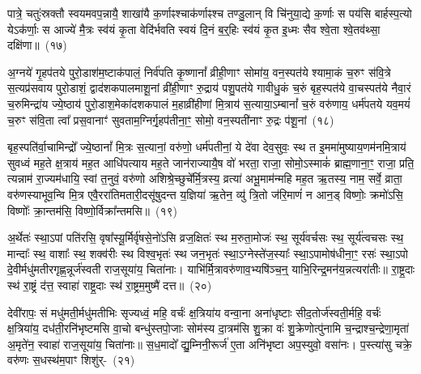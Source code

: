 पात्रे॒ चतुः॑स्रक्तौ स्वयमवप॒न्नायै॒ शाखा॑यै क॒र्णाꣴश्चा\-क॑र्णाꣴश्च तण्डु॒लान् वि चि॑नुया॒द्ये क॒र्णाः स पय॑सि बार्\mbox{}हस्प॒त्यो ये\-ऽक॑र्णाः॒ स आज्ये॑ मै॒त्रः स्व॑यं कृ॒ता वेदि॑र्भवति स्वयं दि॒नं ब॒र्॒\mbox{}हिः स्व॑यं कृ॒त इ॒ध्मः सैव श्वे॒ता श्वे॒तव॑थ्सा॒ दक्षि॑णा॥~(१७)


{\anuvakamend[{सा॒वि॒त्रं द्वाद॑श\-कपाल॒माश्व॑त्थे॒ त्रय॑स्त्रिꣳशच्च}]}%

अ॒ग्नये॑ गृ॒हप॑तये पुरो॒डाश॑\-म॒ष्टा\-क॑पालं॒ निर्व॑पति कृ॒ष्णानां᳚ व्रीही॒णाꣳ सोमा॑य॒ वन॒स्पत॑ये श्यामा॒कं च॒रुꣳ स॑वि॒त्रे स॒त्यप्र॑सवाय पुरो॒डाशं॒ द्वाद॑श\-कपालमाशू॒नां व्री॑ही॒णाꣳ रु॒द्राय॑ पशु॒पत॑ये गावीधु॒कं च॒रुं बृह॒स्पत॑ये वा॒चस्पत॑ये नैवा॒रं च॒रुमिन्द्रा॑य ज्ये॒ष्ठाय॑ पुरो॒डाश॒मेका॑\-दश\-कपालं म॒हाव्री॑हीणां मि॒त्राय॑ स॒त्याया॒\-ऽम्बानां᳚ च॒रुं वरु॑णाय॒ धर्म॑पतये यव॒मयं॑ च॒रुꣳ स॑वि॒ता त्वा᳚ प्रस॒वानाꣳ॑ सुवताम॒ग्निर्गृ॒हप॑तीना॒ꣳ॒ सोमो॒ वन॒स्पती॑नाꣳ रु॒द्रः प॑शू॒नां~(१८)

बृह॒स्पति॑र्वा॒चामिन्द्रो᳚ ज्ये॒ष्ठानां᳚ मि॒त्रः स॒त्यानां॒ वरु॑णो॒ धर्म॑पतीनां॒ ये दे॑वा देव॒सुवः॒ स्थ त इ॒ममा॑मुष्याय॒णम॑\-नमि॒त्राय॑ सुवध्वं मह॒ते क्ष॒त्राय॑ मह॒त आधि॑पत्याय मह॒ते जान॑राज्यायै॒ष वो॑ भरता॒ राजा॒ सोमो॒\-ऽस्माकं॑ ब्राह्म॒णाना॒ꣳ॒ राजा॒ प्रति॒ त्यन्नाम॑ रा॒ज्यम॑धायि॒ स्वां त॒नुवं॒ वरु॑णो अशिश्रे॒च्छुचे᳚र्मि॒त्रस्य॒ व्रत्या॑ अभू॒माम॑न्महि मह॒त ऋ॒तस्य॒ नाम॒ सर्वे॒ व्राता॒ वरु॑णस्याभूव॒न्वि मि॒त्र एवै॒ररा॑तिमतारी॒दसू॑षुदन्त य॒ज्ञिया॑ ऋ॒तेन॒ व्यु॑ त्रि॒तो ज॑रि॒माणं॑ न आन॒ड् विष्णोः॒ क्रमो॑\-ऽसि॒ विष्णोः᳚ क्रा॒न्तम॑सि॒ विष्णो॒र्विक्रा᳚न्तमसि॥~(१९)

{\anuvakamend[{प॒शू॒नां व्राताः॒ पञ्च॑विꣳशतिश्च}]}%

अ॒र्थेतः॑ स्था॒\-ऽपां पति॑रसि॒ वृषा᳚स्यू॒र्मिर्वृ॑षसे॒नो॑\-ऽसि व्रज॒क्षितः॑ स्थ म॒रुता॒मोजः॑ स्थ॒ सूर्य॑वर्चसः स्थ॒ सूर्य॑त्वचसः स्थ॒ मान्दाः᳚ स्थ॒ वाशाः᳚ स्थ॒ शक्व॑रीः स्थ विश्व॒भृतः॑ स्थ जन॒भृतः॑ स्था॒\-ऽग्नेस्ते॑ज॒स्याः᳚ स्था॒\-ऽपामोष॑धीना॒ꣳ॒ रसः॑ स्था॒\-ऽपो दे॒वीर्मधु॑मतीरगृह्ण॒न्नूर्ज॑स्वती राज॒सूया॑य॒ चिता॑नाः। याभि॑र्मि॒त्रावरु॑णाव॒भ्यषि॑ञ्च॒न्॒ याभि॒रिन्द्र॒मन॑य॒न्नत्यरा॑तीः॥ रा॒ष्ट्र॒दाः स्थ॑ रा॒ष्ट्रं द॑त्त॒ स्वाहा॑ राष्ट्र॒दाः स्थ॑ रा॒ष्ट्रम॒मुष्मै॑ दत्त॥~(२०)

{\anuvakamend[{अत्येका॑\-दश च}]}%

देवी॑रापः॒ सं मधु॑मती॒र्मधु॑मतीभिः सृज्यध्वं॒ महि॒ वर्चः॑ क्ष॒त्रिया॑य वन्वा॒ना अना॑धृष्टाः सीद॒तोर्ज॑स्वती॒र्महि॒ वर्चः॑ क्ष॒त्रिया॑य॒ दध॑ती॒रनि॑भृष्टमसि वा॒चो बन्धु॑स्तपो॒जाः सोम॑स्य दा॒त्रम॑सि शु॒क्रा वः॑ शु॒क्रेणोत्पु॑नामि च॒न्द्राश्च॒न्द्रेणा॒मृता॑ अ॒मृते॑न॒ स्वाहा॑ राज॒सूया॑य॒ चिता॑नाः॥ स॒ध॒मादो᳚ द्यु॒म्निनी॒रूर्ज॑ ए॒ता अनि॑भृष्टा अप॒स्युवो॒ वसा॑नः। प॒स्त्या॑सु चक्रे॒ वरु॑णः स॒धस्थ॑म॒पाꣳ शिशु॑र्-~(२१)


